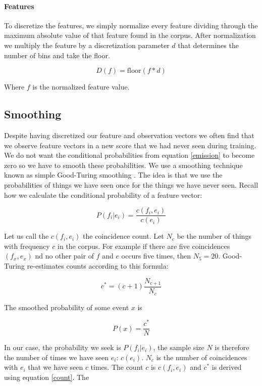 \documentclass[a4paper,10pt]{article}
\begin{document}
\paragraph*{Features}

To discretize the features, we simply normalize every feature dividing through the maximum absolute value of that feature found in the corpus. After normalization we multiply the feature by a discretization parameter $d$ that determines the number of bins and take the floor.

\[
D(f) = \mbox{floor}(f*d)
\]

Where $f$ is the normalized feature value.

\subsection{Smoothing}
\label{sec:smoothing}

Despite having discretized our feature and observation vectors we often find that we observe feature vectors in a new score that we had never seen during training. We do not want the conditional probabilities from equation \ref{emission} to become zero so we have to smooth these probabilities. We use a smoothing technique known as simple Good-Turing smoothing \cite{gale1995good}. The idea is that we use the probabilities of things we have seen once for the things we have never seen. Recall how we calculate the conditional probability of a feature vector:

\[
P(f_i|e_i) = \frac{c(f_i, e_i)}{c(e_i)}
\]

Let us call the $c(f_i, e_i)$ the coincidence count. Let $N_c$ be the number of things with frequency $c$ in the corpus. For example if there are five coincidences $(f_x, e_x)$ nd no other pair of $f$ and $e$ occurs five times, then $N_{5} = 20$. Good-Turing re-estimates counts according to this formula:

\begin{equation}
\label{count}
c^* = (c+1) \frac{N_{c+1}}{N_c}
\end{equation}

The smoothed probability of some event $x$ is

\[P(x) = \frac{c^*}{N}\]

In our case, the probability we seek is $P(f_i|e_i)$, the sample size $N$ is therefore the number of times we have seen $e_i$: $c(e_i)$. $N_c$ is the number of coincidences with $e_i$ that we have seen $c$ times. The count $c$ is $c(f_i, e_i)$ and $c^*$ is derived using equation \ref{count}. The 
\end{document}
